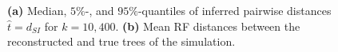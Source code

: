 \documentclass[9pt,english,utf8]{article}
\begin{document}
\begin{figure}[tbh!]
    

    \caption{\textbf{(a)} Median, $5\%$-, and $95\%$-quantiles of inferred
    pairwise distances $\hat t = d_{SI}$ for $k=10, 400$. \textbf{(b)} Mean RF
    distances between the reconstructed and true trees of the simulation. }
\label{fig:results}
\end{figure}
\end{document}
